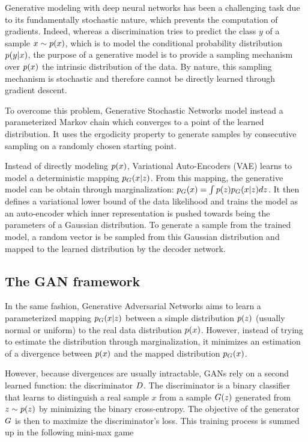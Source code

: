 Generative modeling with deep neural networks has been a challenging task due to its fundamentally stochastic nature, which prevents the computation of gradients. Indeed, whereas a discrimination tries to predict the class $y$ of a sample $x \sim p(x)$, which is to model the conditional probability distribution $p(y|x)$, the purpose of a generative model is to provide a sampling mechanism over $p(x)$  the intrinsic distribution of the data. By nature, this sampling mechanism is stochastic and therefore cannot be directly learned through gradient descent.

To overcome this problem,  Generative Stochastic Networks\cite{Bengio2012b}  model instead a parameterized Markov chain which converges to a point of the learned distribution. It uses the ergodicity property to generate samples by consecutive sampling on a randomly chosen starting point. 

Instead of directly modeling $p(x)$, Variational Auto-Encoders (\ac{VAE})\cite{Kingmaa} learns to model a deterministic mapping $p_G(x|z)$. From this mapping, the generative model can be obtain through marginalization: $p_G(x) = \int p(z) p_G(x|z) dz$. It then defines a variational lower bound of the data likelihood and trains the model as an auto-encoder which inner representation is pushed towards being the parameters of a Gaussian distribution. To generate a sample from the trained model, a random vector is be sampled from this Gaussian distribution and mapped to the learned distribution by the decoder network.


\subsection{The GAN framework}

In the same fashion, Generative Adversarial Networks aims to learn a parameterized mapping $p_G(x|z)$ between a simple distribution $p(z)$ (usually normal or uniform) to the real data distribution $p(x)$. However, instead of trying to estimate the distribution through marginalization, it minimizes an estimation of a divergence between $p(x)$ and the mapped distribution $p_G(x)$. 

However, because divergences are usually intractable, \ac{GAN}s rely on a second learned function: the discriminator $D$.  The discriminator is a binary classifier that learns to distinguish a real sample $x$ from a sample $G(z)$ generated from $z\sim p(z)$ by minimizing the binary cross-entropy. The objective of the generator $G$ is then to maximize the discriminator's loss. This training process is summed up in the following mini-max game


